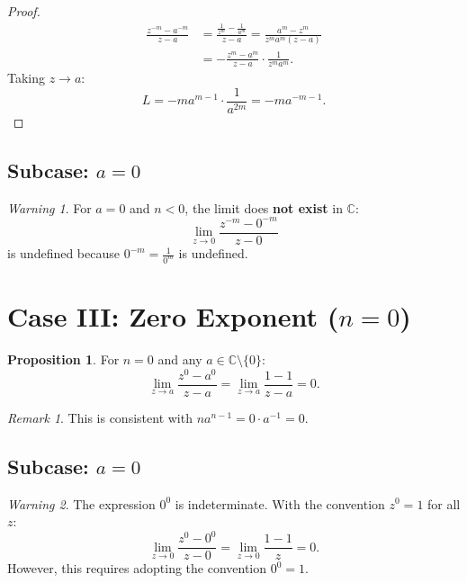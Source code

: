 \documentclass{article}
\theoremstyle{definition}
\newtheorem{proposition}{Proposition}[section]
\theoremstyle{remark}
\newtheorem{remark}{Remark}[section]
\newtheorem{warning}{Warning}[section]
\newcommand{\C}{\mathbb{C}}
\begin{document}
\begin{proof}
\begin{align}
\frac{z^{-m} - a^{-m}}{z - a} &= \frac{\frac{1}{z^m} - \frac{1}{a^m}}{z - a} = \frac{a^m - z^m}{z^m a^m (z - a)} \\
&= -\frac{z^m - a^m}{z - a} \cdot \frac{1}{z^m a^m}.
\end{align}
Taking $z \to a$:
\begin{equation}
L = -m a^{m-1} \cdot \frac{1}{a^{2m}} = -m a^{-m-1}.
\end{equation}
\end{proof}

\subsection{Subcase: $a = 0$}

\begin{warning}
For $a = 0$ and $n < 0$, the limit does \textbf{not exist} in $\C$:
\begin{equation}
\lim_{z \to 0} \frac{z^{-m} - 0^{-m}}{z - 0}
\end{equation}
is undefined because $0^{-m} = \frac{1}{0^m}$ is undefined.
\end{warning}

\section{Case III: Zero Exponent ($n = 0$)}

\begin{proposition}
For $n = 0$ and any $a \in \C \setminus \{0\}$:
\begin{equation}
\lim_{z \to a} \frac{z^0 - a^0}{z - a} = \lim_{z \to a} \frac{1 - 1}{z - a} = 0.
\end{equation}
\end{proposition}

\begin{remark}
This is consistent with $n a^{n-1} = 0 \cdot a^{-1} = 0$.
\end{remark}

\subsection{Subcase: $a = 0$}

\begin{warning}
The expression $0^0$ is indeterminate. With the convention $z^0 = 1$ for all $z$:
\begin{equation}
\lim_{z \to 0} \frac{z^0 - 0^0}{z - 0} = \lim_{z \to 0} \frac{1 - 1}{z} = 0.
\end{equation}
However, this requires adopting the convention $0^0 = 1$.
\end{warning}
\end{document}
